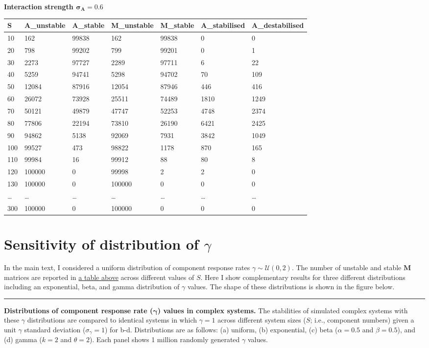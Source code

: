 \documentclass[]{article}
\begin{document}
\textbf{Interaction strength \(\mathbf{\sigma_{A} = 0.6}\)}

\begin{longtable}[]{@{}lllllll@{}}
\toprule
S & A\_unstable & A\_stable & M\_unstable & M\_stable & A\_stabilised &
A\_destabilised\tabularnewline
\midrule
\endhead
10 & 162 & 99838 & 162 & 99838 & 0 & 0\tabularnewline
20 & 798 & 99202 & 799 & 99201 & 0 & 1\tabularnewline
30 & 2273 & 97727 & 2289 & 97711 & 6 & 22\tabularnewline
40 & 5259 & 94741 & 5298 & 94702 & 70 & 109\tabularnewline
50 & 12084 & 87916 & 12054 & 87946 & 446 & 416\tabularnewline
60 & 26072 & 73928 & 25511 & 74489 & 1810 & 1249\tabularnewline
70 & 50121 & 49879 & 47747 & 52253 & 4748 & 2374\tabularnewline
80 & 77806 & 22194 & 73810 & 26190 & 6421 & 2425\tabularnewline
90 & 94862 & 5138 & 92069 & 7931 & 3842 & 1049\tabularnewline
100 & 99527 & 473 & 98822 & 1178 & 870 & 165\tabularnewline
110 & 99984 & 16 & 99912 & 88 & 80 & 8\tabularnewline
120 & 100000 & 0 & 99998 & 2 & 2 & 0\tabularnewline
130 & 100000 & 0 & 100000 & 0 & 0 & 0\tabularnewline
\ldots{} & \ldots{} & \ldots{} & \ldots{} & \ldots{} & \ldots{} &
\ldots{}\tabularnewline
300 & 100000 & 0 & 100000 & 0 & 0 & 0\tabularnewline
\bottomrule
\end{longtable}

\hypertarget{gam_dist}{\section{\texorpdfstring{Sensitivity of
distribution of
\(\gamma\)}{Sensitivity of distribution of \textbackslash{}gamma}}\label{gam_dist}}

In the main text, I considered a uniform distribution of component
response rates \(\gamma \sim \mathcal{U}(0, 2)\). The number of unstable
and stable \(\mathbf{M}\) matrices are reported in
\protect\hyperlink{IncrS}{a table above} across different values of
\(S\). Here I show complementary results for three different
distributions including an exponential, beta, and gamma distribution of
\(\gamma\) values. The shape of these distributions is shown in the
figure below.

\begin{center}\rule{0.5\linewidth}{\linethickness}\end{center}

\textbf{Distributions of component response rate
(\(\boldsymbol{\gamma}\)) values in complex systems.} The stabilities of
simulated complex systems with these \(\gamma\) distributions are
compared to identical systems in which \(\gamma = 1\) across different
system sizes (\(S\); i.e., component numbers) given a unit \(\gamma\)
standard deviation (\(\sigma_{\gamma} = 1\)) for b-d. Distributions are
as follows: (a) uniform, (b) exponential, (c) beta (\(\alpha = 0.5\) and
\(\beta = 0.5\)), and (d) gamma (\(k = 2\) and \(\theta = 2\)). Each
panel shows 1 million randomly generated \(\gamma\) values.
\end{document}
